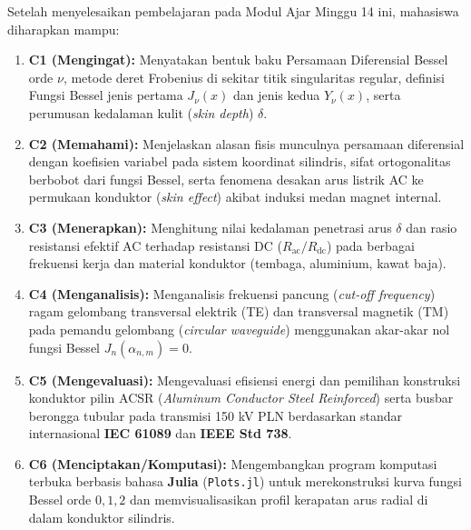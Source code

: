 \documentclass[11pt,a4paper]{article}
\theoremstyle{definition}
\begin{document}
\begin{tcolorbox}[colback=blue!5!white,colframe=headercolor,title=\textbf{Capaian Pembelajaran Khusus (Sub-CPMK 6)}]
Setelah menyelesaikan pembelajaran pada Modul Ajar Minggu 14 ini, mahasiswa diharapkan mampu:
\begin{enumerate}[leftmargin=*]
    \item \textbf{C1 (Mengingat):} Menyatakan bentuk baku Persamaan Diferensial Bessel orde $\nu$, metode deret Frobenius di sekitar titik singularitas regular, definisi Fungsi Bessel jenis pertama $J_\nu(x)$ dan jenis kedua $Y_\nu(x)$, serta perumusan kedalaman kulit (\textit{skin depth}) $\delta$.
    \item \textbf{C2 (Memahami):} Menjelaskan alasan fisis munculnya persamaan diferensial dengan koefisien variabel pada sistem koordinat silindris, sifat ortogonalitas berbobot dari fungsi Bessel, serta fenomena desakan arus listrik AC ke permukaan konduktor (\textit{skin effect}) akibat induksi medan magnet internal.
    \item \textbf{C3 (Menerapkan):} Menghitung nilai kedalaman penetrasi arus $\delta$ dan rasio resistansi efektif AC terhadap resistansi DC ($R_{\text{ac}}/R_{\text{dc}}$) pada berbagai frekuensi kerja dan material konduktor (tembaga, aluminium, kawat baja).
    \item \textbf{C4 (Menganalisis):} Menganalisis frekuensi pancung (\textit{cut-off frequency}) ragam gelombang transversal elektrik (TE) dan transversal magnetik (TM) pada pemandu gelombang (\textit{circular waveguide}) menggunakan akar-akar nol fungsi Bessel $J_n(\alpha_{n,m}) = 0$.
    \item \textbf{C5 (Mengevaluasi):} Mengevaluasi efisiensi energi dan pemilihan konstruksi konduktor pilin ACSR (\textit{Aluminum Conductor Steel Reinforced}) serta busbar berongga tubular pada transmisi 150 kV PLN berdasarkan standar internasional \textbf{IEC 61089} dan \textbf{IEEE Std 738}.
    \item \textbf{C6 (Menciptakan/Komputasi):} Mengembangkan program komputasi terbuka berbasis bahasa \textbf{Julia} (\texttt{Plots.jl}) untuk merekonstruksi kurva fungsi Bessel orde $0, 1, 2$ dan memvisualisasikan profil kerapatan arus radial di dalam konduktor silindris.
\end{enumerate}
\end{tcolorbox}

\vspace{0.3cm}
\tableofcontents
\vspace{0.5cm}
\end{document}

